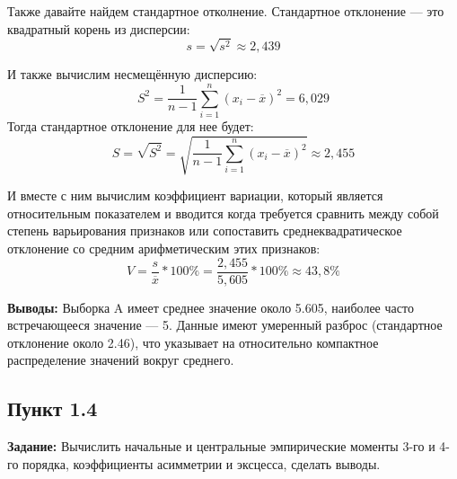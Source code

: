 \documentclass[12pt]{article}
\begin{document}
Также давайте найдем стандартное отколнение. Стандартное отклонение — это квадратный корень из дисперсии:\\
$$ s = \sqrt{s^2} \approx 2,439 $$

И также вычислим несмещённую дисперсию:
$$ S^2 = \frac{1}{n-1} \sum_{i=1}^n (x_i - \overline{x})^2 = 6,029$$
Тогда стандартное отклонение для нее будет:
$$ S = \sqrt{S^2} = \sqrt{\frac{1}{n-1} \sum_{i=1}^n (x_i - \overline{x})^2} \approx 2,455 $$

И вместе с ним вычислим коэффициент вариации, который является относительным показателем и вводится когда требуется сравнить между собой степень варьирования признаков или сопоставить среднеквадратическое отклонение со средним арифметическим этих признаков:
$$ V = \frac{s}{\overline{x}} * 100\% = \frac{2,455}{5,605} * 100\% \approx 43,8\% $$

\textbf{Выводы:} Выборка A имеет среднее значение около 5.605, наиболее часто встречающееся значение — 5. Данные имеют умеренный разброс (стандартное отклонение около 2.46), что указывает на относительно компактное распределение значений вокруг среднего.

\subsection*{Пункт 1.4}
\textbf{Задание:} Вычислить начальные и центральные эмпирические моменты 3-го и 4-го порядка, коэффициенты асимметрии и эксцесса, сделать выводы.\\
\end{document}
